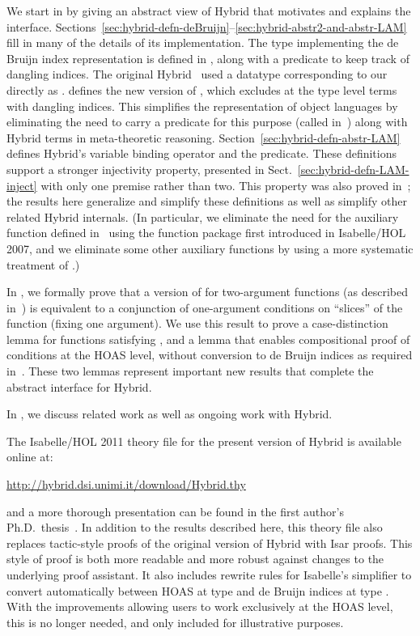 \documentclass[copyright,creativecommons]{eptcs}
\begin{document}
We start in  by giving an abstract view
of Hybrid that motivates and explains the interface.
Sections~\ref{sec:hybrid-defn-deBruijn}--\ref{sec:hybrid-abstr2-and-abstr-LAM}
fill in many of the details of its implementation.
The type  implementing the de Bruijn index representation is
defined in , along with a
predicate  to keep track of dangling indices.  The original
Hybrid~\cite{ambler/crole/momigliano:2002} used a datatype
corresponding to our  directly as .
 defines the new version of
, which excludes at the type level terms with dangling
indices. This simplifies the representation of object languages by
eliminating the need to carry a predicate for this purpose (called
 in~\cite{ambler/crole/momigliano:2002}) along with
Hybrid terms in meta-theoretic reasoning.
Section~\ref{sec:hybrid-defn-abstr-LAM} defines Hybrid's variable
binding operator  and the  predicate.  These
definitions support a stronger injectivity property, presented in
Sect.~\ref{sec:hybrid-defn-LAM-inject} with only one 
premise rather than two.  This property was also proved
in~\cite{momigliano/martin/felty:2008}; the results here generalize
and simplify these definitions as well as simplify other related
Hybrid internals.  (In particular, we eliminate the need for the
auxiliary function  defined
in~\cite{momigliano/martin/felty:2008} using the function package first
introduced in Isabelle/HOL 2007, and we eliminate some other auxiliary
functions by using a more systematic treatment of .)

In , we formally prove that
a version of  for two-argument functions (as described
in~\cite{momigliano/ambler/crole:2002}) is equivalent to a conjunction
of one-argument  conditions on ``slices'' of the function
(fixing one argument).  We use this result to prove a case-distinction
lemma for functions satisfying , and a lemma that enables
compositional proof of  conditions at the HOAS level,
without conversion to de Bruijn indices as required
in~\cite{ambler/crole/momigliano:2002}.  These two lemmas represent
important new results that complete the abstract interface for Hybrid.

In , we discuss related work as well as
ongoing work with Hybrid.

The Isabelle/HOL 2011 theory file for the present version of Hybrid is
available online at:
\begin{center}
\url{http://hybrid.dsi.unimi.it/download/Hybrid.thy}
\end{center}
and a more thorough presentation can be found in the first author's
Ph.D.\ thesis~\cite{martin:2010a,martin:2010b}.
In addition to the results described here, this theory file also
replaces tactic-style proofs of the original version of Hybrid with
Isar proofs.  This style of proof is both more readable and more
robust against changes to the underlying proof assistant.  It also
includes rewrite rules for Isabelle's simplifier to convert
automatically between HOAS at type  and de Bruijn indices at
type .  With the improvements allowing users to work
exclusively at the HOAS level, this is no longer needed, and only
included for illustrative purposes.
\end{document}
